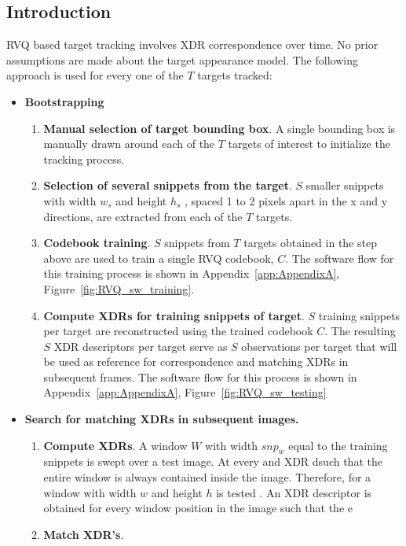 \documentclass[12pt,letterpaper,doublespaced,ETD]{gt-ece-thesis} %
\begin{document}
\begin{Body}
\section{Introduction}
RVQ based target tracking involves XDR correspondence over time.  No prior assumptions are made about the target appearance model.  The following approach is used for every one of the $T$ targets tracked:

\begin{itemize}
	\item \textbf{Bootstrapping}
		\begin{enumerate}
			\item \textbf{Manual selection of target bounding box}.  A single bounding box is manually drawn around each of the $T$ targets of interest to initialize the tracking process.  		
			\item \textbf{Selection of several snippets from the target}.  $S$ smaller snippets with width $w_s$ and height $h_s$ , spaced 1 to 2 pixels apart in the x and y directions, are extracted from each of the $T$ targets.
			\item \textbf{Codebook training}.  $S$ snippets from $T$ targets obtained in the step above are used to train a single RVQ codebook, $C$.  The software flow for this training process is shown in Appendix~\ref{app:AppendixA}, Figure~\ref{fig:RVQ_sw_training}.
			\item \textbf{Compute XDRs for training snippets of target}.  $S$ training snippets per target are reconstructed using the trained codebook $C$.  The resulting $S$ XDR descriptors per target serve as $S$ observations per target that will be used as reference for correspondence and matching XDRs in subsequent frames.  The software flow for this process is shown in Appendix~\ref{app:AppendixA}, Figure~\ref{fig:RVQ_sw_testing}
		\end{enumerate}
	\item \textbf{Search for matching XDRs in subsequent images.}  
		\begin{enumerate}	
			\item \textbf{Compute XDRs}.  A window $W$ with width $snp_w$ equal to the training snippets is swept over a test image.  At every and XDR dsuch that the entire window is always contained inside the image.  Therefore, for a window with width $w$ and height $h$ is tested .  An XDR descriptor is obtained for every window position in the image such that the e  
			\item \textbf{Match XDR's}.
		\end{enumerate}
\end{itemize}



\end{Body}
\end{document}
